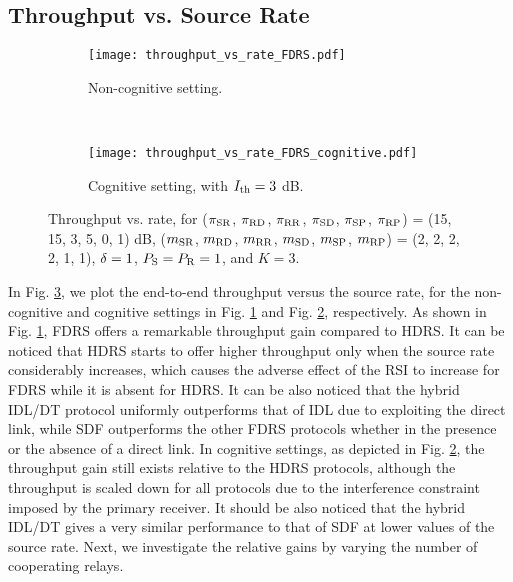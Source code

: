 \documentclass[10pt,journal]{IEEEtran}
\newcommand{\figscl}{0.7}
\begin{document}
\subsection{Throughput vs. Source Rate}
\begin{figure}
\centering
\begin{subfigure}[t]{\figscl\columnwidth}
\centering
\texttt{[image: throughput\_vs\_rate\_FDRS.pdf]}
\caption{Non-cognitive setting.}
\label{throughput_vs_rate_non_cognitive}
\end{subfigure}\\
\begin{subfigure}[t]{\figscl\columnwidth}
\texttt{[image: throughput\_vs\_rate\_FDRS\_cognitive.pdf]}
\caption{Cognitive setting, with $I_{\rm th}=3$ dB.}
\label{throughput_vs_rate_cognitive}
\end{subfigure}
\centering
\caption{Throughput vs. rate, for (${\pi_{{\rm S} {\rm R}}}$, ${\pi_{{\rm R} {\rm D}}}$, ${\pi_{{\rm R} {\rm R}}}$, ${\pi_{{\rm S} {\rm D}}}$, ${\pi_{{\rm S} {\rm P}}}$, ${\pi_{{\rm R} {\rm P}}}$) = (15, 15, 3, 5, 0, 1) dB,  (${m_{{\rm S} {\rm R}}}$, ${m_{{\rm R} {\rm D}}}$, ${m_{{\rm R} {\rm R}}}$, ${m_{{\rm S} {\rm D}}}$, ${m_{{\rm S} {\rm P}}}$, ${m_{{\rm R} {\rm P}}}$) = (2, 2, 2, 2, 1, 1), $\delta=1$, $P_{{\rm S}}=P_{{\rm R}}=1$, and $K=3$.}
\label{throughput_vs_rate}
\vspace{-7mm}
\end{figure}
In Fig. \ref{throughput_vs_rate}, we plot the end-to-end throughput versus the source rate, for the non-cognitive and cognitive settings in Fig. \ref{throughput_vs_rate_non_cognitive} and Fig. \ref{throughput_vs_rate_cognitive}, respectively. As shown in Fig. \ref{throughput_vs_rate_non_cognitive}, \ac{FDRS} offers a remarkable throughput gain compared to \ac{HDRS}. It can be noticed that \ac{HDRS} starts to offer higher throughput only when the source rate considerably increases, which causes the adverse effect of the \ac{RSI} to increase for \ac{FDRS} while it is absent for \ac{HDRS}. It can be also noticed that the hybrid \ac{IDL}/\ac{DT} protocol uniformly outperforms that of \ac{IDL} due to exploiting the direct link, while \ac{SDF} outperforms the other \ac{FDRS} protocols whether in the presence or the absence of a direct link. In cognitive settings, as depicted in Fig. \ref{throughput_vs_rate_cognitive}, the throughput gain still exists relative to the \ac{HDRS} protocols, although the throughput is scaled down for all protocols due to the interference constraint imposed by the primary receiver. It should be also noticed that the hybrid \ac{IDL}/\ac{DT} gives a very similar performance to that of \ac{SDF} at lower values of the source rate. Next, we investigate the relative gains by varying the number of cooperating relays.
\end{document}
